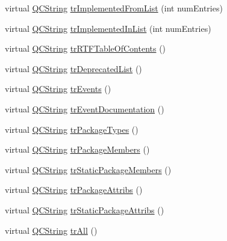 \begin{DoxyCompactItemize}
virtual \mbox{\hyperlink{class_q_c_string}{Q\+C\+String}} \mbox{\hyperlink{class_translator_chinesetraditional_a9b081ef4ec88e0e25d04824351a77089}{tr\+Implemented\+From\+List}} (int num\+Entries)
\item 
virtual \mbox{\hyperlink{class_q_c_string}{Q\+C\+String}} \mbox{\hyperlink{class_translator_chinesetraditional_a0e333fc233c2a61076715266cb684c77}{tr\+Implemented\+In\+List}} (int num\+Entries)
\item 
virtual \mbox{\hyperlink{class_q_c_string}{Q\+C\+String}} \mbox{\hyperlink{class_translator_chinesetraditional_afa9fb73edd1669644f8631c983d94913}{tr\+R\+T\+F\+Table\+Of\+Contents}} ()
\item 
virtual \mbox{\hyperlink{class_q_c_string}{Q\+C\+String}} \mbox{\hyperlink{class_translator_chinesetraditional_a028e21ebc33dffcd502982aa7fa64503}{tr\+Deprecated\+List}} ()
\item 
virtual \mbox{\hyperlink{class_q_c_string}{Q\+C\+String}} \mbox{\hyperlink{class_translator_chinesetraditional_ad83304224ff49e184e4e14624f8ec300}{tr\+Events}} ()
\item 
virtual \mbox{\hyperlink{class_q_c_string}{Q\+C\+String}} \mbox{\hyperlink{class_translator_chinesetraditional_abbe57b2f5a4ce7b21871953016d4217e}{tr\+Event\+Documentation}} ()
\item 
virtual \mbox{\hyperlink{class_q_c_string}{Q\+C\+String}} \mbox{\hyperlink{class_translator_chinesetraditional_acf06113451a4b7429244afb10279857a}{tr\+Package\+Types}} ()
\item 
virtual \mbox{\hyperlink{class_q_c_string}{Q\+C\+String}} \mbox{\hyperlink{class_translator_chinesetraditional_aa67be8f3476106a7ffc1a07a66ff4189}{tr\+Package\+Members}} ()
\item 
virtual \mbox{\hyperlink{class_q_c_string}{Q\+C\+String}} \mbox{\hyperlink{class_translator_chinesetraditional_a1bda44c8593eb149e18425fd8a10ec3d}{tr\+Static\+Package\+Members}} ()
\item 
virtual \mbox{\hyperlink{class_q_c_string}{Q\+C\+String}} \mbox{\hyperlink{class_translator_chinesetraditional_a3df74e7c393faf110b039fd8c52df59c}{tr\+Package\+Attribs}} ()
\item 
virtual \mbox{\hyperlink{class_q_c_string}{Q\+C\+String}} \mbox{\hyperlink{class_translator_chinesetraditional_a39d7a776bf00a1231a1688751fd710ef}{tr\+Static\+Package\+Attribs}} ()
\item 
virtual \mbox{\hyperlink{class_q_c_string}{Q\+C\+String}} \mbox{\hyperlink{class_translator_chinesetraditional_aa1b51ab16b0482c3bd451cb82dceb6f7}{tr\+All}} ()

\end{DoxyCompactItemize}

